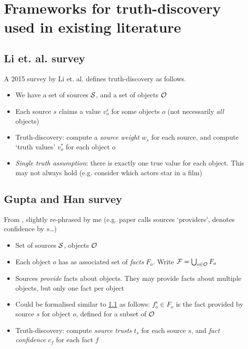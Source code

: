 \documentclass[../main.tex]{subfiles}
\begin{document}
\section{Frameworks for truth-discovery used in existing literature}
\label{sec:existing_frameworks}

\subsection{Li et. al. survey}
\label{sec:li}

A 2015 survey by Li et. al. {\cite{li_survey}} defines truth-discovery as
follows.

\begin{itemize}
\item We have a set of sources $\S$, and a set of objects $\O$
\item Each source $s$ claims a value $v_{o}^{s}$ for some objects $o$ (not
necessarily \emph{all} objects)
\item Truth-discovery: compute a \emph{source weight} $w_s$ for each source,
and compute `truth values' $v_{o}^{*}$ for each object $o$
\item \emph{Single truth assumption}: there is exactly one true value for each
object. This may not always hold (e.g. consider which actors star in a film)
\end{itemize}

\subsection{Gupta and Han survey}
\label{sec:gupta}

From \cite{gupta_han_survey}, slightly re-phrased by me (e.g. paper calls
sources `providers', denotes confidence by $s$\ldots)

\begin{itemize}
\item Set of sources $\S$, objects $\O$
\item Each object $o$ has as associated set of \emph{facts} $F_o$. Write
$\F = \bigcup_{o \in \O}F_o$
\item Sources \emph{provide} facts about objects. They may provide facts about
multiple objects, but only one fact per object
\item Could be formalised similar to \ref{sec:li} as follows: $f_o^s \in F_o$
is the fact provided by source $s$ for object $o$, defined for a subset of $\O$
\item Truth-discovery: compute \emph{source trusts} $t_s$ for each source $s$,
and \emph{fact confidence} $c_f$ for each fact $f$
\end{itemize}
\end{document}
